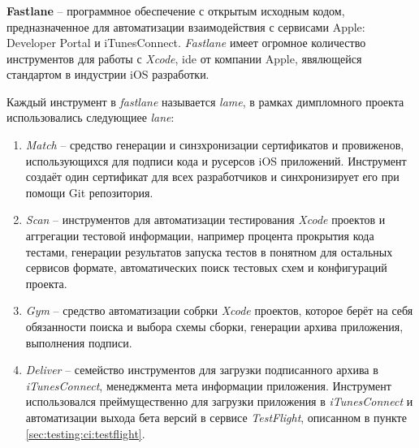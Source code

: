 \subsubsection{}
\label{sec:testing:ci:fastlane}

\textbf{Fastlane} -- программное обеспечение с открытым исходным кодом, предназначенное для автоматизации взаимодействия с сервисами Apple: Developer Portal и iTunesConnect. \textit{Fastlane} имеет огромное количество инструментов для работы с \textit{Xcode}, \gls{ide} от компании Apple, явялющейся стандартом в индустрии iOS разработки.

Каждый инструмент в \textit{fastlane} называется \textit{lame}, в рамках димпломного проекта использовались следующиее \textit{lane}:

\begin{enumerate}
	\item \textit{Match} -- средство генерации и синзхронизации сертификатов и провиженов, использующихся для подписи кода и русерсов iOS приложений. Инструмент создаёт один сертификат для всех разработчиков и синхронизирует его при помощи Git репозитория.
	\item \textit{Scan} -- инструментов для автоматизации тестирования \textit{Xcode} проектов и аггрегации тестовой информации, например процента прокрытия кода тестами, генерации результатов запуска тестов в понятном для остальных сервисов формате, автоматических поиск тестовых схем и конфигураций проекта.
	\item \textit{Gym} -- средство автоматизации собрки \textit{Xcode} проектов, которое берёт на себя обязанности поиска и выбора схемы сборки, генерации архива приложения, выполнения подписи.
	\item \textit{Deliver} -- семейство инструментов для загрузки подписанного архива в \textit{iTunesConnect}, менеджмента мета информации приложения. Инструмент использовался преймущественно для загрузки приложения в \textit{iTunesConnect} и автоматизации выхода бета версий в сервисе \textit{TestFlight}, описанном в пункте \ref{sec:testing:ci:testflight}.
\end{enumerate}